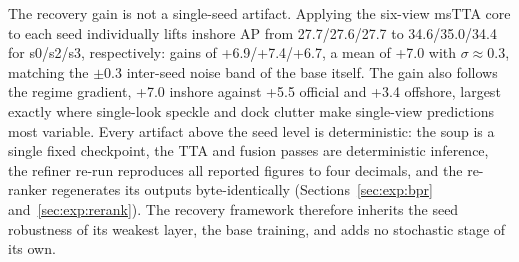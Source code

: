The recovery gain is not a single-seed artifact. Applying the six-view msTTA core to each seed individually lifts inshore AP from 27.7/27.6/27.7 to 34.6/35.0/34.4 for s0/s2/s3, respectively: gains of +6.9/+7.4/+6.7, a mean of +7.0 with $\sigma\approx0.3$, matching the $\pm$0.3 inter-seed noise band of the base itself. The gain also follows the regime gradient, +7.0 inshore against +5.5 official and +3.4 offshore, largest exactly where single-look speckle and dock clutter make single-view predictions most variable. Every artifact above the seed level is deterministic: the soup is a single fixed checkpoint, the TTA and fusion passes are deterministic inference, the refiner re-run reproduces all reported figures to four decimals, and the re-ranker regenerates its outputs byte-identically (Sections~\ref{sec:exp:bpr} and~\ref{sec:exp:rerank}). The recovery framework therefore inherits the seed robustness of its weakest layer, the base training, and adds no stochastic stage of its own.
